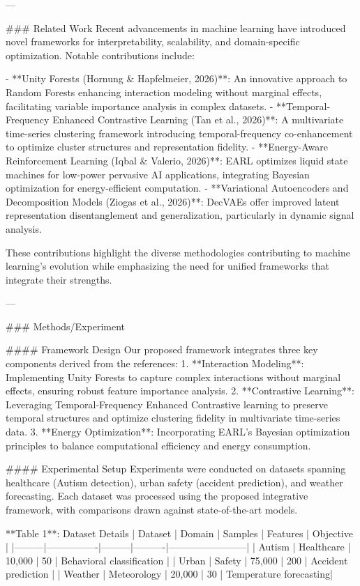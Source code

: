 ---

### Related Work
Recent advancements in machine learning have introduced novel frameworks for interpretability, scalability, and domain-specific optimization. Notable contributions include:

- **Unity Forests (Hornung & Hapfelmeier, 2026)**: An innovative approach to Random Forests enhancing interaction modeling without marginal effects, facilitating variable importance analysis in complex datasets.
- **Temporal-Frequency Enhanced Contrastive Learning (Tan et al., 2026)**: A multivariate time-series clustering framework introducing temporal-frequency co-enhancement to optimize cluster structures and representation fidelity.
- **Energy-Aware Reinforcement Learning (Iqbal & Valerio, 2026)**: EARL optimizes liquid state machines for low-power pervasive AI applications, integrating Bayesian optimization for energy-efficient computation.
- **Variational Autoencoders and Decomposition Models (Ziogas et al., 2026)**: DecVAEs offer improved latent representation disentanglement and generalization, particularly in dynamic signal analysis.

These contributions highlight the diverse methodologies contributing to machine learning's evolution while emphasizing the need for unified frameworks that integrate their strengths.

---

### Methods/Experiment

#### Framework Design
Our proposed framework integrates three key components derived from the references:
1. **Interaction Modeling**: Implementing Unity Forests to capture complex interactions without marginal effects, ensuring robust feature importance analysis.
2. **Contrastive Learning**: Leveraging Temporal-Frequency Enhanced Contrastive learning to preserve temporal structures and optimize clustering fidelity in multivariate time-series data.
3. **Energy Optimization**: Incorporating EARL's Bayesian optimization principles to balance computational efficiency and energy consumption.

#### Experimental Setup
Experiments were conducted on datasets spanning healthcare (Autism detection), urban safety (accident prediction), and weather forecasting. Each dataset was processed using the proposed integrative framework, with comparisons drawn against state-of-the-art models.

**Table 1**: Dataset Details  
| Dataset | Domain         | Samples | Features | Objective              |
|---------|----------------|---------|----------|------------------------|
| Autism  | Healthcare     | 10,000  | 50       | Behavioral classification |
| Urban   | Safety         | 75,000  | 200      | Accident prediction    |
| Weather | Meteorology    | 20,000  | 30       | Temperature forecasting|

